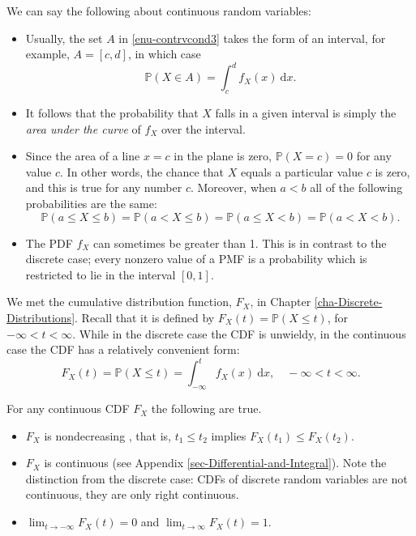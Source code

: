 \documentclass[captions=tableheading]{scrbook}
\begin{document}
\begin{rem}
We can say the following about continuous random variables:
\begin{itemize}
\item Usually, the set \(A\) in \ref{enu-contrvcond3} takes the form of an interval, for example, \(A=[c,d]\), in which case
  \begin{equation}
  \mathbb{P}(X\in A)=\int_{c}^{d}f_{X}(x)\:\mathrm{d} x.
  \end{equation}
\item It follows that the probability that \(X\) falls in a given interval is simply the \emph{area under the curve} of \(f_{X}\) over the interval.
\item Since the area of a line \(x=c\) in the plane is zero, \(\mathbb{P}(X=c)=0\)  for any value \(c\). In other words, the chance that \(X\) equals a particular value \(c\) is zero, and this is true for any number \(c\). Moreover, when \(a<b\) all of the following probabilities are the same:
  \begin{equation}
  \mathbb{P}(a\leq X\leq b)=\mathbb{P}(a<X\leq b)=\mathbb{P}(a\leq X<b)=\mathbb{P}(a<X<b).
  \end{equation}
\item The PDF \(f_{X}\) can sometimes be greater than 1. This is in contrast to the discrete case; every nonzero value of a PMF is a probability which is restricted to lie in the interval \([0,1]\).
\end{itemize}

\end{rem}

We met the cumulative distribution function, \(F_{X}\), in Chapter \ref{cha-Discrete-Distributions}. Recall that it is defined by \(F_{X}(t)=\mathbb{P}(X\leq t)\), for \(-\infty<t<\infty\). While in the discrete case the CDF is unwieldy, in the continuous case the CDF has a relatively convenient form:
\begin{equation}
F_{X}(t)=\mathbb{P}(X\leq t)=\int_{-\infty}^{t}f_{X}(x)\:\mathrm{d} x,\quad-\infty<t<\infty.
\end{equation}

\begin{rem}
For any continuous CDF \(F_{X}\) the following are true.
\begin{itemize}
\item \(F_{X}\) is nondecreasing , that is, \(t_{1}\leq t_{2}\) implies \(F_{X}(t_{1})\leq F_{X}(t_{2})\).
\item \(F_{X}\) is continuous (see Appendix \ref{sec-Differential-and-Integral}). Note the distinction from the discrete case: CDFs of discrete random variables are not continuous, they are only right continuous.
\item \(\lim_{t\to-\infty}F_{X}(t)=0\) and \(\lim_{t\to\infty}F_{X}(t)=1\).
\end{itemize}

\end{rem}
\end{document}
